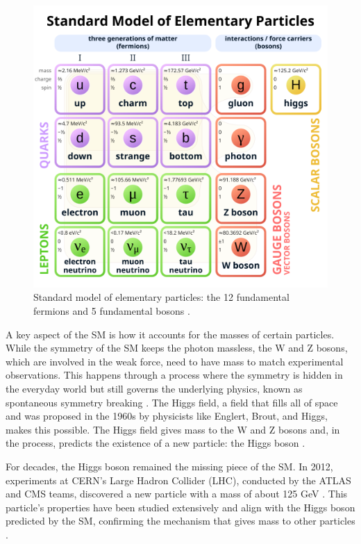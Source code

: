 \begin{figure}[h]
    \centering
    \includegraphics[width=0.75\linewidth]{media/1024px-Standard_Model_of_Elementary_Particles.svg.png}
    \caption{Standard model of elementary particles: the 12 fundamental fermions and 5 fundamental bosons \cite{cush:standard-model}.}
    \label{fig:standard_model}
\end{figure}

A key aspect of the SM is how it accounts for the masses of certain particles. While the symmetry of the SM keeps the photon massless, the W and Z bosons, which are involved in the weak force, need to have mass to match experimental observations. This happens through a process where the symmetry is hidden in the everyday world but still governs the underlying physics, known as spontaneous symmetry breaking \cite{pich2012standardmodelelectroweakinteractions}. The Higgs field, a field that fills all of space and was proposed in the 1960s by physicists like Englert, Brout, and Higgs, makes this possible. The Higgs field gives mass to the W and Z bosons and, in the process, predicts the existence of a new particle: the Higgs boson \cite{pich2012standardmodelelectroweakinteractions}.

For decades, the Higgs boson remained the missing piece of the SM. In 2012, experiments at CERN’s Large Hadron Collider (LHC), conducted by the ATLAS and CMS teams, discovered a new particle with a mass of about 125 GeV \cite{Chatrchyan_2012}. This particle’s properties have been studied extensively and align with the Higgs boson predicted by the SM, confirming the mechanism that gives mass to other particles  \cite{Chatrchyan_2012}.

